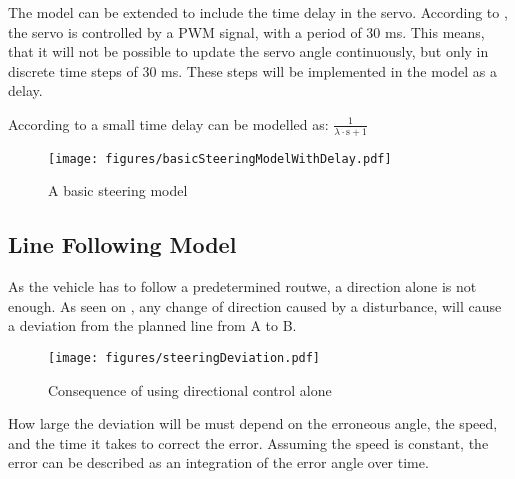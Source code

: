 The model can be extended to include the time delay in the servo. According to , the servo is controlled by a PWM signal, with a period of 30 ms. This means, that it will not be possible to update the servo angle continuously, but only in discrete time steps of 30 ms. These steps will be implemented in the model as a delay.



According to  a small time delay can be modelled as:
$\frac{1}{\lambda\cdot\text{s}+1}$ 

\begin{figure}[H]
	\centering
	\texttt{[image: figures/basicSteeringModelWithDelay.pdf]}
	\caption{A basic steering model}
	\label{basicSteeringWithDelay}
\end{figure}

\subsection{Line Following Model}
As the vehicle has to follow a predetermined routwe, a direction alone is not enough. As seen on , any change of direction caused by a disturbance, will cause a deviation from the planned line from A to B.

\begin{figure}[H]
	\centering
	\texttt{[image: figures/steeringDeviation.pdf]}
	\caption{Consequence of using directional control alone}
	\label{SteeringDeviation}
\end{figure}

How large the deviation will be must depend on the erroneous angle, the speed, and the time it takes to correct the error. Assuming the speed is constant, the error can be described as an integration of the error angle over time.









